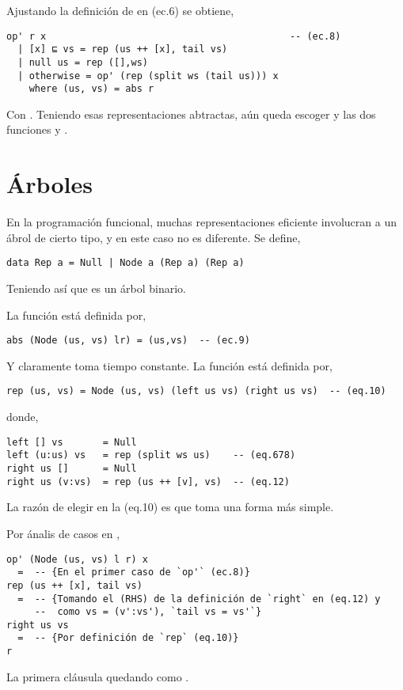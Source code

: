 Ajustando la definición de  en (ec.6) se obtiene,
\begin{verbatim}
op' r x                                           -- (ec.8)
  | [x] ⊑ vs = rep (us ++ [x], tail vs)
  | null us = rep ([],ws)
  | otherwise = op' (rep (split ws (tail us))) x
    where (us, vs) = abs r  
\end{verbatim}

Con . Teniendo esas representaciones
abtractas, aún queda escoger  y las dos funciones  y .

\section{Árboles}
En la programación funcional, muchas representaciones eficiente involucran a un ábrol de cierto
tipo, y en este caso no es diferente. Se define,
\begin{verbatim}
data Rep a = Null | Node a (Rep a) (Rep a)
\end{verbatim}

Teniendo así que  es un árbol binario.

La función  está definida por,
\begin{verbatim}
abs (Node (us, vs) lr) = (us,vs)  -- (ec.9)
\end{verbatim}

Y claramente toma tiempo constante. La función  está definida por,

\begin{verbatim}
rep (us, vs) = Node (us, vs) (left us vs) (right us vs)  -- (eq.10)
\end{verbatim}

donde,

\begin{verbatim}
left [] vs       = Null
left (u:us) vs   = rep (split ws us)    -- (eq.678)
right us []      = Null
right us (v:vs)  = rep (us ++ [v], vs)  -- (eq.12)
\end{verbatim}

La razón de elegir  en la (eq.10) es que  toma una forma más simple.

Por ánalis de casos en ,
\begin{verbatim}
op' (Node (us, vs) l r) x
  =  -- {En el primer caso de `op'` (ec.8)}
rep (us ++ [x], tail vs)
  =  -- {Tomando el (RHS) de la definición de `right` en (eq.12) y 
     --  como vs = (v':vs'), `tail vs = vs'`}
right us vs
  =  -- {Por definición de `rep` (eq.10)}
r
\end{verbatim}
La primera cláusula quedando como . %


